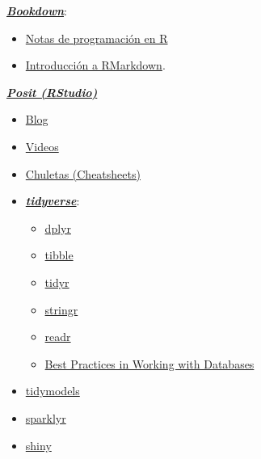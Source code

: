 \documentclass[
]{book}
\theoremstyle{break}
\theoremstyle{nonumberplain}
\begin{document}
\href{https://bookdown.org}{\textbf{\emph{Bookdown}}}:

\begin{itemize}
\item
  \href{https://rubenfcasal.github.io/book_notasr/}{Notas de programación en R}
\item
  \href{https://rubenfcasal.github.io/bookdown_intro/rmarkdown.html}{Introducción a RMarkdown}.
\end{itemize}

\href{https://posit.co}{\textbf{\emph{Posit (RStudio)}}}

\begin{itemize}
\item
  \href{https://posit.co/blog}{Blog}
\item
  \href{https://posit.co/resources/videos}{Videos}
\item
  \href{https://posit.co/resources/cheatsheets}{Chuletas (Cheatsheets)}
\item
  \href{https://www.tidyverse.org/}{\textbf{\emph{tidyverse}}}:

  \begin{itemize}
  \item
    \href{https://dplyr.tidyverse.org}{dplyr}
  \item
    \href{https://tibble.tidyverse.org}{tibble}
  \item
    \href{https://tidyr.tidyverse.org}{tidyr}
  \item
    \href{https://stringr.tidyverse.org}{stringr}
  \item
    \href{https://readr.tidyverse.org}{readr}
  \item
    \href{https://solutions.posit.co/connections/db}{Best Practices in Working with Databases}
  \end{itemize}
\item
  \href{https://www.tidymodels.org}{tidymodels}
\item
  \href{https://spark.rstudio.com/}{sparklyr}
\item
  \href{http://shiny.rstudio.com}{shiny}
\end{itemize}

  
\end{document}
